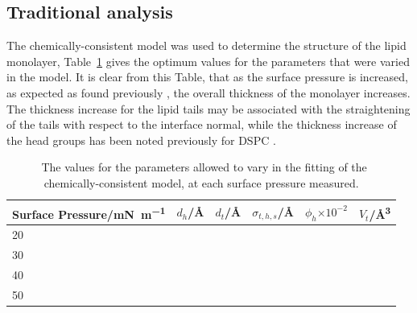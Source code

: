 \documentclass[amsmath,amssymb,twocolumn,superscriptaddress]{revtex4-1}
\begin{document}
\subsection{Traditional analysis}
The chemically-consistent model was used to determine the structure of the lipid monolayer, Table~\ref{tab:cc} gives the optimum values for the parameters that were varied in the model.
It is clear from this Table, that as the surface pressure is increased, as expected as found previously \cite{mohwald_phospholipid_1990,vaknin_structural_1991}, the overall thickness of the monolayer increases.
The thickness increase for the lipid tails may be associated with the straightening of the tails with respect to the interface normal, while the thickness increase of the head groups has been noted previously for DSPC \cite{hollinshead_effects_2009}.
%
\begin{table}
\small
  \caption{\ The values for the parameters allowed to vary in the fitting of the chemically-consistent model, at each surface pressure measured.}
  \label{tab:cc}
  \begin{tabular*}{\textwidth}{@{\extracolsep{\fill}}llllll}
    \hline
    Surface Pressure/\si{\milli\newton\per\meter} & $d_h$/\si{\angstrom} & $d_t$/\si{\angstrom} & $\sigma_{t,h,s}$/\si{\angstrom} & $\phi_h$$\times10^{-2}$ & $V_t$/\si{\angstrom\cubed} \\
    \hline
    20 &  &  &  &  &  \\
    30 &  &  &  &  &  \\
    40 &  &  &  &  &  \\
    50 &  &  &  &  &  \\
    \hline
  \end{tabular*}
\end{table}
%
\end{document}
